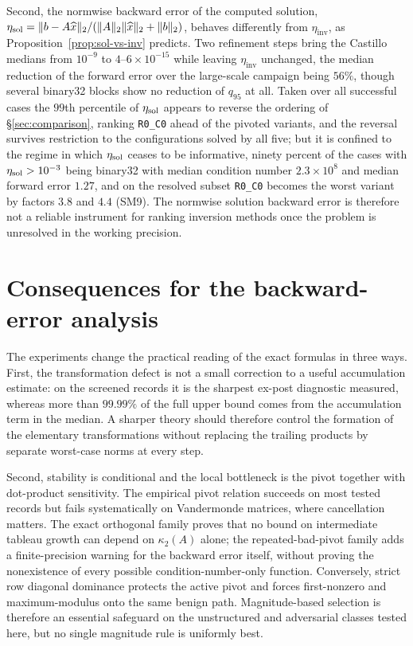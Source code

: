 \documentclass[review,onefignum,onetabnum]{siamart251216}
\begin{document}
Second, the normwise backward error of the computed solution,
$\eta_{\rm sol} = \|b-A\widehat x\|_2/(\|A\|_2\|\widehat x\|_2 + \|b\|_2)$, behaves differently
from $\eta_{\mathrm{inv}}$, as Proposition~\ref{prop:sol-vs-inv} predicts. Two refinement steps
bring the Castillo medians from $10^{-9}$ to $4$--$6\times10^{-15}$ while leaving
$\eta_{\mathrm{inv}}$ unchanged, the median reduction of the forward error over the large-scale
campaign being $56\%$, though several binary32 blocks show no reduction of $q_{95}$ at all. Taken
over all successful cases the $99$th percentile of $\eta_{\rm sol}$ appears to reverse the
ordering of \S\ref{sec:comparison}, ranking \texttt{R0\_C0} ahead of the pivoted variants, and
the reversal survives restriction to the configurations solved by all five; but it is confined to
the regime in which $\eta_{\rm sol}$ ceases to be informative, ninety percent of the cases with
$\eta_{\rm sol}>10^{-3}$ being binary32 with median condition number $2.3\times10^{8}$ and median
forward error $1.27$, and on the resolved subset \texttt{R0\_C0} becomes the worst variant by
factors $3.8$ and $4.4$ (SM9). The normwise solution backward error is therefore not a reliable
instrument for ranking inversion methods once the problem is unresolved in the working
precision.

\section{Consequences for the backward-error analysis}
\label{sec:discussion}

The experiments change the practical reading of the exact formulas in three ways.  First, the
transformation defect is not a small correction to a useful accumulation estimate: on the screened
records it is the sharpest ex-post diagnostic measured, whereas more than $99.99\%$ of the full
upper bound comes from the accumulation term in the median.  A sharper theory should therefore
control the formation of the elementary transformations without replacing the trailing products by
separate worst-case norms at every step.

Second, stability is conditional and the local bottleneck is the pivot together with dot-product
sensitivity.  The empirical pivot relation succeeds on most tested records but fails systematically
on Vandermonde matrices, where cancellation matters.  The exact orthogonal family proves that no
bound on intermediate tableau growth can depend on $\kappa_2(A)$ alone; the repeated-bad-pivot
family adds a finite-precision warning for the backward error itself, without proving the
nonexistence of every possible condition-number-only function.  Conversely, strict row diagonal
dominance protects the active pivot and forces first-nonzero and maximum-modulus onto the same benign
path.  Magnitude-based selection is therefore an essential safeguard on the unstructured and
adversarial classes tested here, but no single magnitude rule is uniformly best.
\end{document}

